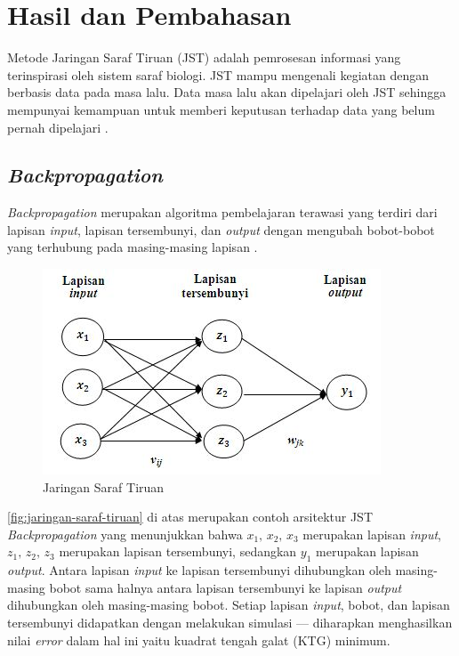 \section{Hasil dan Pembahasan}


Metode Jaringan Saraf Tiruan (JST) adalah pemrosesan informasi yang terinspirasi oleh sistem saraf biologi. JST mampu mengenali kegiatan dengan berbasis data pada masa lalu. Data masa lalu akan dipelajari oleh JST sehingga mempunyai kemampuan untuk memberi keputusan terhadap data yang belum pernah dipelajari \cite{Hasanah-2014:isoss}.

\subsection{\textit{Backpropagation}}

\textit{Backpropagation} merupakan algoritma pembelajaran terawasi yang terdiri dari lapisan \textit{input}, lapisan tersembunyi, dan \textit{output} dengan mengubah bobot-bobot yang terhubung pada masing-masing lapisan \cite{shi-2012}.

\begin{figure}[H]
    \centering
    \includegraphics[width=.6\linewidth]{image/JST.jpg}
    \caption{Jaringan Saraf Tiruan}
    \label{fig:jaringan-saraf-tiruan}
\end{figure}

\autoref{fig:jaringan-saraf-tiruan} di atas merupakan contoh arsitektur JST \textit{Backpropagation} yang menunjukkan bahwa $x_1,\, x_2,\, x_3$ merupakan lapisan \textit{input}, $z_1,\, z_2,\, z_3$ merupakan lapisan tersembunyi, sedangkan $y_1$ merupakan lapisan \textit{output}. Antara lapisan \textit{input} ke lapisan tersembunyi dihubungkan oleh masing-masing bobot sama halnya antara lapisan tersembunyi ke lapisan \textit{output} dihubungkan oleh masing-masing bobot. Setiap lapisan \textit{input}, bobot, dan lapisan tersembunyi didapatkan dengan melakukan simulasi --- diharapkan menghasilkan nilai \textit{error} dalam hal ini yaitu kuadrat tengah galat (KTG) minimum.

